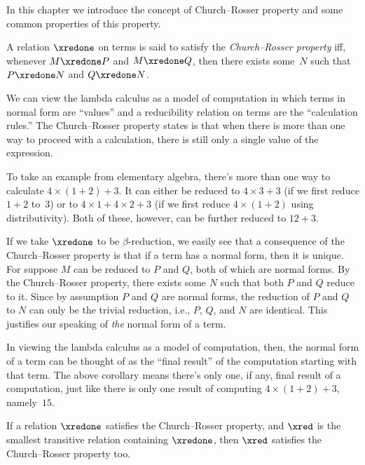\documentclass[../../../include/open-logic-section]{subfiles}
\begin{document}


In this chapter we introduce the concept of Church--Rosser property and
some common properties of this property.

\begin{defn} A relation $\xredone$ on
  terms is said to satisfy the \emph{Church--Rosser property} iff,
  whenever $M \xredone P$ and $M \xredone Q$, then there exists
  some~$N$ such that $P \xredone N$ and $Q \xredone N$.
\end{defn}

We can view the lambda calculus as a model of computation in which
terms in normal form are ``values'' and a reducibility relation on
terms are the ``calculation rules.'' The Church--Rosser property states
is that when there is more than one way to proceed with a calculation,
there is still only a single value of the expression.

To take an example from elementary algebra, there's more than one way
to calculate $4 \times (1+2) + 3$. It can either be reduced to $4
\times 3+3$ (if we first reduce $1+2$ to~$3$) or to $4 \times 1+4
\times 2+3$ (if we first reduce $4 \times (1+2)$ using
distributivity). Both of these, however, can be further reduced to
$12+3$.

If we take $\xredone$ to be $\beta$-reduction, we easily see that a
consequence of the Church--Rosser property is that if a term has a
normal form, then it is unique. For suppose $M$ can be reduced to $P$
and $Q$, both of which are normal forms. By the Church--Rosser property,
there exists some $N$ such that both $P$ and $Q$ reduce to it. Since
by assumption $P$ and $Q$ are normal forms, the reduction of $P$ and
$Q$ to $N$ can only be the trivial reduction, i.e., $P$, $Q$, and $N$
are identical. This justifies our speaking of \emph{the} normal form
of a term.

In viewing the lambda calculus as a model of computation, then, the
normal form of a term can be thought of as the ``final result'' of the
computation starting with that term. The above corollary means there's
only one, if any, final result of a computation, just like there is
only one result of computing $4 \times (1+2)+3$, namely~$15$.

\begin{thm} 
  If a relation $\xredone$ satisfies the Church--Rosser property, and $\xred$ is the
  smallest transitive relation containing $\xredone$, then $\xred$ satisfies
  the Church--Rosser property too.
\end{thm}
\end{document}
